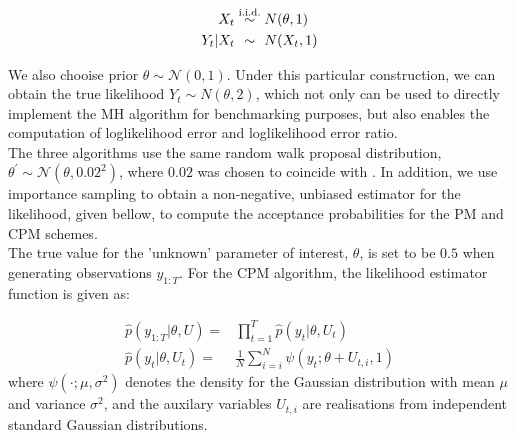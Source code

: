 \documentclass{article}
\begin{document}
  \begin{align*}
  X_t &\overset{\text{i.i.d.}}{\sim} N(\theta, 1) \\
  Y_t | X_t &\overset{\hphantom{\text{i.i.d.}}}{\sim} N(X_t, 1)
  \end{align*}

We also chooise prior $\theta \sim \mathcal{N}(0,1)$. Under this particular construction, we can obtain the true likelihood $Y_t \sim N(\theta, 2)$, which not only can be used to directly implement the MH algorithm for benchmarking purposes, but also enables the computation of loglikelihood error and loglikelihood error ratio.\\


The three algorithms use the same random walk proposal distribution, $ \theta^\prime \sim \mathcal{N}(\theta, 0.02^2)$, where $0.02$ was chosen to coincide with \cite{cpmmDeligiannidis2015}. In addition, we use importance sampling to obtain a non-negative, unbiased estimator for the likelihood, given bellow, to compute the acceptance probabilities for the PM and CPM schemes.\\

The true value for the 'unknown' parameter of interest, $\theta$, is set to be $0.5$ when generating observations $y_{1:T}$. For the CPM algorithm, the likelihood estimator function is given as:

\begin{align}
\hat{p}(y_{1:T}| \theta, U) =& \prod_{t=1}^{T} \hat{p}(y_t|\theta, U_t) \\
\hat{p}(y_t| \theta, U_t)=& \frac{1}{N} \sum_{i=i}^N \psi (y_t; \theta + U_{t,i}, 1)
\end{align}
where $\psi(\cdot; \mu, \sigma^2)$ denotes the density for the Gaussian distribution with mean $\mu$ and variance $\sigma^2$, and the auxilary variables $U_{t,i}$ are realisations from independent standard Gaussian distributions.
\end{document}
